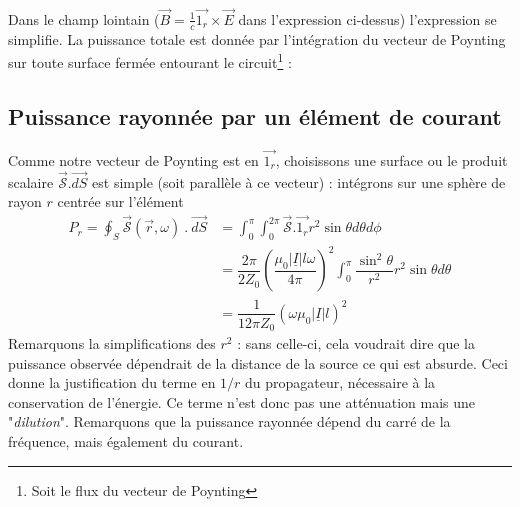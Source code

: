 	\ 
	
	Dans le champ lointain ($\vec{B} = \frac{1}{c}\vec{1_r}\times\vec{E}$ dans 
	l'expression ci-dessus) l'expression se simplifie. La puissance totale est donnée par 
	l'intégration du vecteur de Poynting sur toute surface fermée entourant le circuit\footnote{
	Soit le flux du vecteur de Poynting} :\\
	
	\subsection{Puissance rayonnée par un élément de courant}
	Comme notre vecteur de Poynting est en $\vec{1_r}$, choisissons une surface ou le produit 
	scalaire $\vec{\mathcal{S}}.\vec{dS}$ est simple (soit parallèle à ce vecteur) : intégrons 
	sur une sphère de rayon $r$ centrée sur l'élément
	\begin{equation}
	\begin{split}
	P_r = \oint_S \vec{\mathcal{S}}(\vec{r},\omega)\ .\ \vec{dS}  &= \int_0^{\pi}\int_0^{2\pi}
	\vec{\mathcal{S}}.\vec{1_r}r^2\sin\theta d\theta d\phi\\
	&= \dfrac{2\pi}{2Z_0}\left(\dfrac{\mu_0|\underline{I}|l\omega}{4\pi}\right)^2 \int_0^\pi 
	\dfrac{\sin^2\theta}{r^2}r^2\sin\theta d\theta\\
	&= \dfrac{1}{12\pi Z_0}\left(\omega\mu_0|\underline{I}|l\right)^2
	\end{split}
	\end{equation}
	Remarquons la simplifications des $r^2$ : sans celle-ci, cela voudrait dire que la puissance 
	observée dépendrait de la distance de la source ce qui est absurde. Ceci donne la justification 
	du terme en $1/r$ du propagateur, nécessaire à la conservation de l'énergie. Ce terme n'est 
	donc pas une atténuation mais une "\textit{dilution}". Remarquons que la puissance rayonnée 
	dépend du carré de la fréquence, mais également du courant.
	
